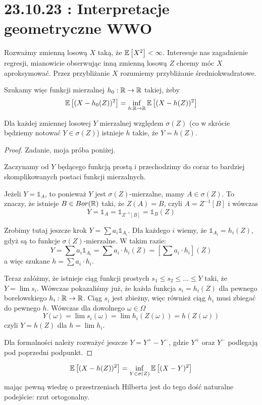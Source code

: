 \section{23.10.23 : Interpretacje geometryczne WWO}

Rozważmy zmienną losową $X$ taką, że $\expected{X^2}<\infty$. Interesuje nas zagadnienie regresji, mianowicie obserwując inną zmienną losową $Z$ chcemy móc $X$ aproksymować. Przez przybliżanie $X$ rozumiemy przybliżanie średniokwadratowe. 

Szukamy więc funkcji mierzalnej $h_0:\operatorname{\mathbb{R}}\to\operatorname{\mathbb{R}}$ takiej, żeby 
$$\expected{(X-h_0(Z))^2}=\inf_{h:\R\to\R}\expected{(X-h(Z))^2}$$

\begin{fact}\label{fakt 3.1}
  Dla każdej zmiennej losowej $Y$ mierzalnej względem $\sigma(Z)$ (co w skrócie będziemy notować $Y\in\sigma(Z)$) istnieje $h$ takie, że $Y=h(Z)$.
\end{fact}

\begin{proof}
  Zadanie, moja próba poniżej.

  Zaczynamy od $Y$ będącego funkcją prostą i przechodzimy do coraz to bardziej skomplikowanych postaci funkcji mierzalnych.

  Jeżeli $Y=\mathds{1}_A$, to ponieważ $Y$ jest $\sigma(Z)$-mierzalne, mamy $A\in\sigma(Z)$. To znaczy, że istnieje $B\in Bor(\operatorname{\mathbb{R}})$ taki, że $Z(A)=B$, czyli $A=Z^{-1}[B]$ i wówczas
  $$Y=\mathds{1}_A=\mathds{1}_{Z^{-1}[B]}=\mathds{1}_B(Z)$$

  Zrobimy tutaj jeszcze krok $Y=\sum a_i\mathds{1}_{A_i}$. Dla każdego $i$ wiemy, że $\mathds{1}_{A_i}=h_i(Z)$, gdyż są to funkcje $\sigma(Z)$-mierzalne. W takim razie:
  $$Y=\sum a_i\mathds{1}_{A_i}=\sum a_i\cdot h_i(Z)=\left[\sum a_i\cdot h_i\right](Z)$$
  a więc szukane $h=\sum a_i\cdot h_i$.

  Teraz załóżmy, że istnieje ciąg funkcji prostych $s_1\leq s_2\leq...\leq Y$ taki, że $Y=\lim s_i$. Wówczas pokazaliśmy już, że każda funkcja $s_i=h_i(Z)$ dla pewnego borelowskiego $h_i:\operatorname{\mathbb{R}}\to\operatorname{\mathbb{R}}$. Ciąg $s_i$ jest zbieżny, więc również ciąg $h_i$ musi zbiegać do pewnego $h$. Wówczas dla dowolnego $\omega\in\Omega$
  $$Y(\omega)=\lim s_i(\omega)=\lim h_i(Z(\omega))=h(Z(\omega))$$
  czyli $Y=h(Z)$ dla $h=\lim h_i$.

  Dla formalności należy rozważyć jeszcze $Y=Y^+-Y^-$, gdzie $Y^+$ oraz $Y^-$ podlegają pod poprzedni podpunkt.
\end{proof}

$$\expected{(X-h(Z))^2}=\inf_{Y\in\sigma(Z)}\expected{(X-Y)^2}$$
mając pewną wiedzę o przestrzeniach Hilberta jest do tego dość naturalne podejście: rzut ortogonalny.

